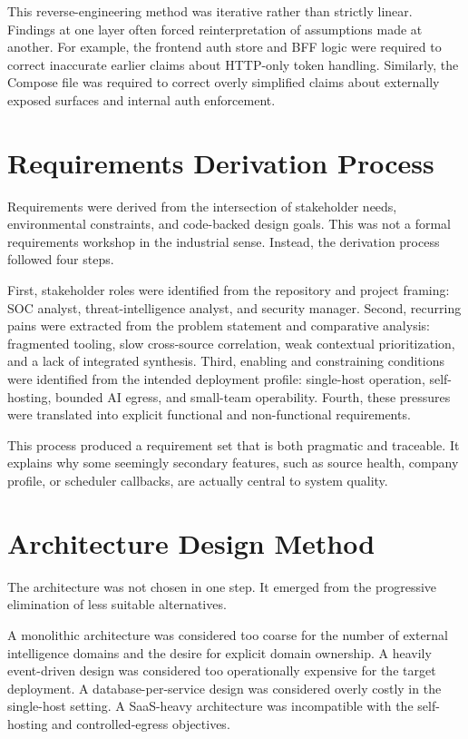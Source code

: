 This reverse-engineering method was iterative rather than strictly linear. Findings at one layer often forced reinterpretation of assumptions made at another. For example, the frontend auth store and BFF logic were required to correct inaccurate earlier claims about HTTP-only token handling. Similarly, the Compose file was required to correct overly simplified claims about externally exposed surfaces and internal auth enforcement.

\section{Requirements Derivation Process}
Requirements were derived from the intersection of stakeholder needs, environmental constraints, and code-backed design goals. This was not a formal requirements workshop in the industrial sense. Instead, the derivation process followed four steps.

First, stakeholder roles were identified from the repository and project framing: SOC analyst, threat-intelligence analyst, and security manager. Second, recurring pains were extracted from the problem statement and comparative analysis: fragmented tooling, slow cross-source correlation, weak contextual prioritization, and a lack of integrated synthesis. Third, enabling and constraining conditions were identified from the intended deployment profile: single-host operation, self-hosting, bounded AI egress, and small-team operability. Fourth, these pressures were translated into explicit functional and non-functional requirements.

This process produced a requirement set that is both pragmatic and traceable. It explains why some seemingly secondary features, such as source health, company profile, or scheduler callbacks, are actually central to system quality.

\section{Architecture Design Method}
The architecture was not chosen in one step. It emerged from the progressive elimination of less suitable alternatives.

A monolithic architecture was considered too coarse for the number of external intelligence domains and the desire for explicit domain ownership. A heavily event-driven design was considered too operationally expensive for the target deployment. A database-per-service design was considered overly costly in the single-host setting. A SaaS-heavy architecture was incompatible with the self-hosting and controlled-egress objectives.

